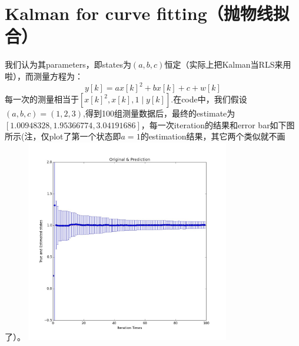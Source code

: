 \documentclass[10pt,journal,doublecolumn]{IEEEtran}
\begin{document}
\section{Kalman for curve fitting（抛物线拟合）}
\label{sec-3}
我们认为其parameters，即states为\((a,b,c)\)恒定（实际上把Kalman当RLS来用啦），而测量方程为：
\begin{equation}
y[k]=ax[k]^2+bx[k]+c+w[k]
\end{equation}
每一次的测量相当于\([x[k]^2,x[k],1\mid y[k]]\).在code中，我们假设\((a,b,c)=(1, 2, 3)\),得到100组测量数据后，最终的estimate为\([ 1.00948328,1.95366774,3.04191686]\)，每一次iteration的结果和error bar如下图所示(注，仅plot了第一个状态即\(a=1\)的estimation结果，其它两个类似就不画了）。
\includegraphics[width=3.5in]{kalman.jpeg}
\end{document}
